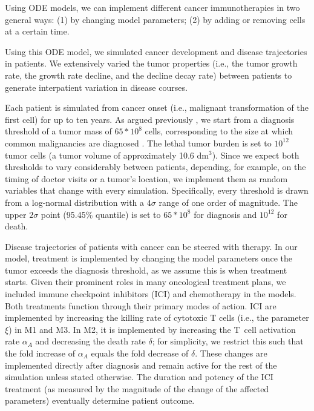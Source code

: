 \documentclass[a4paper,10pt]{article}
\newcommand{\newbit}{\color{red!70!black}}
\begin{document}
Using ODE models, we can implement different cancer immunotherapies in two general ways: (1) 
by changing model parameters; (2) by adding or removing cells at a certain time.

Using this ODE model, we simulated cancer development and disease trajectories in patients. We extensively
varied the tumor properties (i.e., the tumor growth rate, the growth rate decline, and the decline decay
rate) between patients to generate interpatient variation in disease courses. 


Each patient is simulated from cancer onset (i.e., malignant transformation of the first cell) for
up to ten years.
{\newbit {}
 As argued previously \cite{Creemers2021}, 
we start from a diagnosis threshold of a tumor mass of $65 * 10^8$ cells, corresponding to
the size at which common malignancies are diagnosed  \cite{Moreno2016,Zastrow2014,Ball2013}. The lethal tumor burden is set to $10^{12}$ tumor cells
(a tumor volume of approximately 10.6 dm$^3$). Since we expect both thresholds to vary considerably 
between patients, depending, for example, on the timing of doctor visits or a tumor's location, 
we implement them as random variables that change with every simulation. Specifically, every threshold is 
drawn from a log-normal distribution with a $4\sigma$ range of one order of magnitude. The upper $2\sigma$
point (95.45\% quantile) is set to  $65 * 10^8$ for diagnosis and  $10^{12}$ for death.
}

Disease trajectories of patients with cancer can be steered with therapy. 
{\newbit{}
In our model, treatment is implemented
by changing the model parameters once the tumor exceeds the diagnosis threshold, as we assume this is when
treatment starts. Given their prominent roles in many oncological treatment plans, we included immune checkpoint inhibitors (ICI) and
chemotherapy in the models. Both treatments function through their primary modes of action. ICI are
implemented by increasing the killing rate of cytotoxic T cells (i.e., the parameter $\xi$) in M1 and M3.
In M2, it is implemented by increasing the T~cell activation rate $\alpha_A$ and decreasing the death rate $\delta$;
for simplicity, we restrict this such that the fold increase of $\alpha_A$ equals the fold decrease of $\delta$.
These changes are implemented directly after diagnosis and remain active for the rest of the simulation
unless stated otherwise.
}
The duration and potency of the ICI treatment (as measured by the magnitude of the
change of the affected parameters) eventually determine patient outcome.
\end{document}
